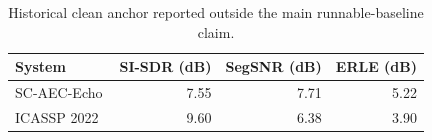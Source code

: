 \begin{table}[t]
\caption{Historical clean anchor reported outside the main runnable-baseline claim.}
\label{tab:historical-anchor}
\centering
\scriptsize
\begin{tabular}{@{}lrrr@{}}
\hline
System & SI-SDR (dB) & SegSNR (dB) & ERLE (dB) \\
\hline
SC-AEC-Echo & 7.55 & 7.71 & 5.22 \\
ICASSP 2022~\cite{cutler2022aec} & 9.60 & 6.38 & 3.90 \\
\hline
\end{tabular}
\end{table}
